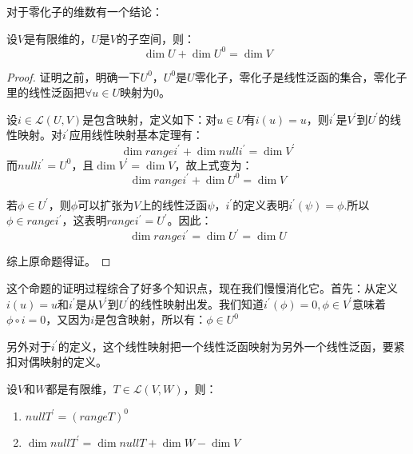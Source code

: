 \documentclass[10pt,a4paper,UTF8]{article}
\begin{document}
对于零化子的维数有一个结论：
\begin{theorem}
设\(V\)是有限维的，\(U\)是\(V\)的子空间，则：\[\dim U + \dim U^{0} = \dim V \]
\end{theorem}

\begin{proof}
证明之前，明确一下\(U^{0}\)，\(U^{0}\)是\(U\)零化子，零化子是线性泛函的集合，零化子里的线性泛函把\(\forall u\in U\)映射为\(0\)。

设\(i\in \mathcal{L}(U,V)\)是包含映射，定义如下：对\(u\in U\)有\(i(u) = u\)，则\(i^{'}\)是\(V^{'}\)到\(U^{'}\)的线性映射。对\(i^{'}\)应用线性映射基本定理有：
\begin{equation}
\label{eq:2}
\dim range i^{'} +\dim null i^{'} = \dim V^{'} 
\end{equation}
而\(null i^{'} = U^{0}\)，且\(\dim V^{'} = \dim V\)，故上式变为：
\begin{equation}
\label{eq:3}
\dim range i^{'} + \dim U^{0} = \dim V
\end{equation}

若\(\phi \in U^{'}\)，则\(\phi\)可以扩张为\(V\)上的线性泛函\(\psi\)，\(i^{'}\)的定义表明\(i^{'}(\psi) = \phi\).所以\(\phi \in range i^{'}\)，这表明\(range i^{'} = U^{'}\)。因此：\[\dim range i^{'} = \dim U^{'} = \dim U\]

综上原命题得证。
\end{proof}

这个命题的证明过程综合了好多个知识点，现在我们慢慢消化它。首先：从定义\(i(u) = u\)和\(i^{'}\)是从\(V^{'}\)到\(U^{'}\)的线性映射出发。我们知道\(i^{'}(\phi) = 0,\phi\in V^{'}\)意味着\(\phi\circ i = 0\)，又因为\(i\)是包含映射，所以有：\(\phi\in U^{0}\)

另外对于\(i^{'}\)的定义，这个线性映射把一个线性泛函映射为另外一个线性泛函，要紧扣对偶映射的定义。

\begin{theorem}
设\(V\)和\(W\)都是有限维，\(T\in \mathcal{L}(V,W)\)，则：
\begin{enumerate}
\item \(null T^{'} = (rangeT)^{0}\)
\item \(\dim nullT^{'} = \dim nullT  + \dim W - \dim V\)
\end{enumerate}
\end{theorem}
\end{document}
